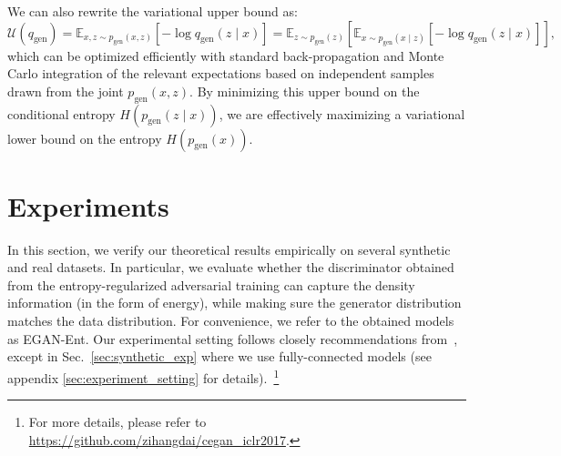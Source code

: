 \documentclass[a4paper]{article}
\newcommand{\pg}{p_\text{gen}}
\newcommand{\qg}{q_\text{gen}}
\begin{document}
We can also rewrite the variational upper bound as:
\begin{equation}
\mathcal{U}(\qg) = \mathbb{E}_{x,z\sim \pg(x,z)}\left[-\log \qg(z\mid x)\right]=\mathbb{E}_{z\sim \pg(z)}\left[\mathbb{E}_{x\sim \pg(x\mid z)}\left[-\log \qg(z\mid x)\right]\right],
\end{equation}
which can be optimized efficiently with standard back-propagation and Monte Carlo integration of the relevant expectations based on independent samples drawn from the joint $\pg(x, z)$. By minimizing this upper bound on the conditional entropy
$H(\pg(z\mid x))$, we are effectively maximizing a variational lower bound on the entropy $H(\pg(x))$.
%
 \section{Experiments}
\label{sec:experiments}
In this section, we verify our theoretical results empirically on several synthetic and real datasets.
In particular, we evaluate whether the discriminator obtained from the entropy-regularized adversarial training can capture the density information (in the form of energy), while making sure the generator distribution matches the data distribution. 
For convenience, we refer to the obtained models as EGAN-Ent.
Our experimental setting follows closely recommendations from~\cite{radford2015unsupervised}, except in Sec.~\ref{sec:synthetic_exp} where we use fully-connected models (see appendix \ref{sec:experiment_setting} for details).~\footnote{For more details, please refer to \url{https://github.com/zihangdai/cegan_iclr2017}.}
\end{document}

